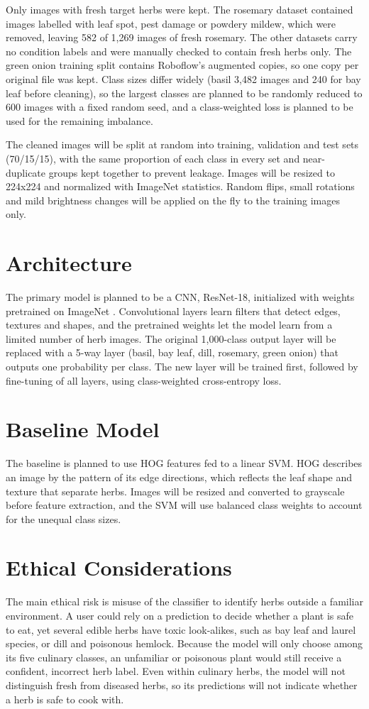\documentclass[final]{article}
\begin{document}
Only images with fresh target herbs were kept. 
The rosemary dataset contained images labelled with leaf spot, pest damage or powdery mildew, which were removed, leaving 582 of 1,269 images of fresh rosemary. 
The other datasets carry no condition labels and were manually checked to contain fresh herbs only. 
The green onion training split contains Roboflow’s augmented copies, so one copy per original file was kept. 
Class sizes differ widely (basil 3,482 images and 240 for bay leaf before cleaning), so the largest classes are planned to be randomly reduced to 600 images with a fixed random seed, and a class-weighted loss is planned to be used for the remaining imbalance.

The cleaned images will be split at random into training, validation and test sets (70/15/15), with the same proportion of each class in every set and near-duplicate groups kept together to prevent leakage. 
Images will be resized to 224x224 and normalized with ImageNet statistics. Random flips, small rotations and mild brightness changes will be applied on the fly to the training images only.

\section*{Architecture}
The primary model is planned to be a CNN, ResNet-18, initialized with weights pretrained on ImageNet \citep{he2016resnet}. 
Convolutional layers learn filters that detect edges, textures and shapes, and the pretrained weights let the model learn from a limited number of herb images.
The original 1,000-class output layer will be replaced with a 5-way layer (basil, bay leaf, dill, rosemary, green onion) that outputs one probability per class. 
The new layer will be trained first, followed by fine-tuning of all layers, using class-weighted cross-entropy loss.
\section*{Baseline Model}
The baseline is planned to use HOG features \citep{dalal2005hog} fed to a linear SVM. 
HOG describes an image by the pattern of its edge directions, which reflects the leaf shape and texture that separate herbs. 
Images will be resized and converted to grayscale before feature extraction, and the SVM will use balanced class weights to account for the unequal class sizes.
\section*{Ethical Considerations}
The main ethical risk is misuse of the classifier to identify herbs outside a familiar environment. 
A user could rely on a prediction to decide whether a plant is safe to eat, yet several edible herbs have toxic look-alikes, such as bay leaf and laurel species, or dill and poisonous hemlock. 
Because the model will only choose among its five culinary classes, an unfamiliar or poisonous plant would still receive a confident, incorrect herb label. 
Even within culinary herbs, the model will not distinguish fresh from diseased herbs, so its predictions will not indicate whether a herb is safe to cook with.
\newpage
\end{document}
